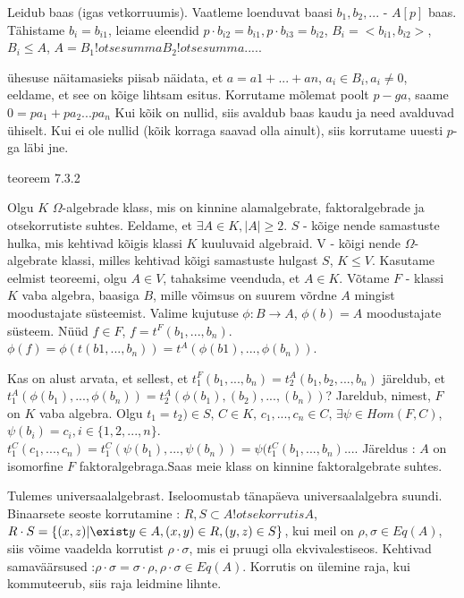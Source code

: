 \documentclass[12pt]{report}
\numberwithin{equation}{section}
\theoremstyle{definition}
\theoremstyle{plain}
\begin{document}
Leidub baas (igas vetkorruumis). Vaatleme loenduvat baasi $b_1,b_2,...$ - $A[p]$ baas. Tähistame $b_i = b_{i1}$, leiame eleendid $p \cdot b_{i2} = b_{i1}, p \cdot b_{i3} = b_{i2}$, $B_i = <b_{i1},b_{i2} >$, $B_i \leq A$, $A = B_1 !otsesumma B_2 !otsesumma .....$

\"uhesuse näitamasieks piisab näidata, et $a = a1+...+an$, $a_i \in B_i, a_i \neq 0$, eeldame, et see on kõige lihtsam esitus. Korrutame mõlemat poolt $p-ga$, saame $0 = p a_1 + p a_2... p a_n$ Kui kõik on nullid, siis avaldub baas kaudu ja need avalduvad \"uhiselt. Kui ei ole nullid (kõik korraga saavad olla ainult), siis korrutame uuesti $p$-ga läbi jne. 

teoreem 7.3.2

Olgu $K$ $\Omega$-algebrade klass, mis on kinnine alamalgebrate, faktoralgebrade ja otsekorrutiste suhtes. Eeldame, et $\exists A \in K, | A | \geq 2$. $S$ - kõige nende samastuste hulka, mis kehtivad kõigis klassi $K$ kuuluvaid algebraid. 
V - kõigi nende $\Omega$-algebrate klassi, milles kehtivad kõigi samastuste hulgast $S$, $K \leq V$. Kasutame eelmist teoreemi, olgu $A \in V$, tahaksime veenduda, et $A \in K$. Võtame $F$ - klassi $K$ vaba algebra, baasiga $B$, mille võimsus on suurem võrdne $A$ mingist moodustajate s\"usteemist.  Valime kujutuse $\phi : B \to A$, $\phi(b) = A$ moodustajate s\"usteem. N\"u\"ud $f \in F$, $f = t^{F} \left( b_1,...,b_n \right)$. $\phi(f) = \phi(t(b1,...,b_n)) = t^{A}(\phi(b1),...,\phi(b_n))$.

Kas on alust arvata, et sellest, et $t_{1}^{F}(b_1,...,b_n) = t_2^{A}(b_1,b_2,...,b_n) $ järeldub, et  $t_{1}^{A}(\phi(b_1),...,\phi(b_n)) = t_2^{A}(\phi(b_1),(b_2),...,(b_n)) $? Jareldub, nimest, $F$ on $K$ vaba algebra. Olgu $t_1=t_2) \in S$, $C \in K$, $c_1,...,c_n \in C$, $\exists \psi \in Hom(F,C)$, $\psi(b_i) = c_i, i \in \lbrace 1,2,...,n \rbrace$. $t_{1}^{C}(c_1,...,c_n) = t_{1}^{C} ( \psi(b_1),...,\psi(b_n) ) = \psi(t_{1}^{C} ( b_1,...,b_n )....$ Järeldus : $A$ on isomorfine $F$ faktoralgebraga.Saas meie klass on kinnine faktoralgebrate suhtes.

Tulemes universaalalgebrast. Iseloomustab tänapäeva universaalalgebra suundi. Binaarsete seoste korrutamine : $R,S \subset A !otsekorrutis A$, $R \cdot S = \left\lbrace (x,z) | \exist y \in A, (x,y) \in R, (y,z) \in S \right\rbrace$, kui meil on $\rho, \sigma \in Eq(A)$, siis võime vaadelda korrutist $\rho \cdot \sigma $, mis ei pruugi olla ekvivalestiseos. Kehtivad samaväärsused :$ \rho \cdot \sigma = \sigma \cdot \rho, \rho \cdot \sigma \in Eq(A)$. Korrutis on \"ulemine raja, kui kommuteerub, siis raja leidmine lihnte. 
\end{document}
